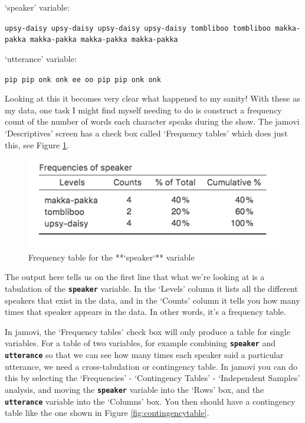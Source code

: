 \documentclass[
]{book}
\begin{document}
`speaker' variable:

\texttt{upsy-daisy\ upsy-daisy\ upsy-daisy\ upsy-daisy\ tombliboo\ tombliboo\ makka-pakka\ makka-pakka\ makka-pakka\ makka-pakka}

`utterance' variable:

\texttt{pip\ pip\ onk\ onk\ ee\ oo\ pip\ pip\ onk\ onk}

Looking at this it becomes very clear what happened to my sanity! With these as my data, one task I might find myself needing to do is construct a frequency count of the number of words each character speaks during the show. The jamovi `Descriptives' screen has a check box called `Frequency tables' which does just this, see Figure \ref{fig:freqtable}.

\begin{figure}

{\centering \includegraphics[width=1\linewidth]{img/mechanics/freqtable} 

}

\caption{Frequency table for the **`speaker`** variable}\label{fig:freqtable}
\end{figure}

The output here tells us on the first line that what we're looking at is a tabulation of the \textbf{\texttt{speaker}} variable. In the `Levels' column it lists all the different speakers that exist in the data, and in the `Counts' column it tells you how many times that speaker appears in the data. In other words, it's a frequency table.

In jamovi, the `Frequency tables' check box will only produce a table for single variables. For a table of two variables, for example combining \textbf{\texttt{speaker}} and \textbf{\texttt{utterance}} so that we can see how many times each speaker said a particular utterance, we need a cross-tabulation or contingency table. In jamovi you can do this by selecting the `Frequencies' - `Contingency Tables' - `Independent Samples' analysis, and moving the \textbf{\texttt{speaker}} variable into the `Rows' box, and the \textbf{\texttt{utterance}} variable into the `Columns' box. You then should have a contingency table like the one shown in Figure \ref{fig:contingencytable}.
\end{document}
